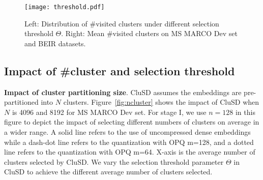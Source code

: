 \begin{figure}[h!]
    \centering
    \texttt{[image: threshold.pdf]}
    \caption{Left: Distribution  of \#visited clusters under different selection threshold $\Theta$.
Right: Mean \#visited clusters on MS MARCO Dev set and BEIR datasets.}
     \vspace*{-5mm}
    \label{fig:thresholds}
\end{figure}

\subsection{Impact of \#cluster and selection threshold} 
\label{sect:clusterno}

\textbf{Impact of  cluster partitioning size}.
CluSD assumes the embeddings are pre-partitioned into $N$ clusters.  Figure~\ref{fig:ncluster} shows the impact of CluSD when
$N$ is  4096 and  8192 for MS MARCO Dev set.
For stage I, we use $n=128$ in this figure to depict the impact of selecting different numbers of clusters on average in a wider range.
A  solid line refers to the use of uncompressed dense embeddings while  a dash-dot line refers to the quantization with OPQ m=128, 
and a dotted line refers to the quantization  with OPQ m=64. X-axis is the average number of clusters selected by CluSD.
We vary the selection threshold parameter $\Theta$ in CluSD to achieve the different average number of clusters selected. 


